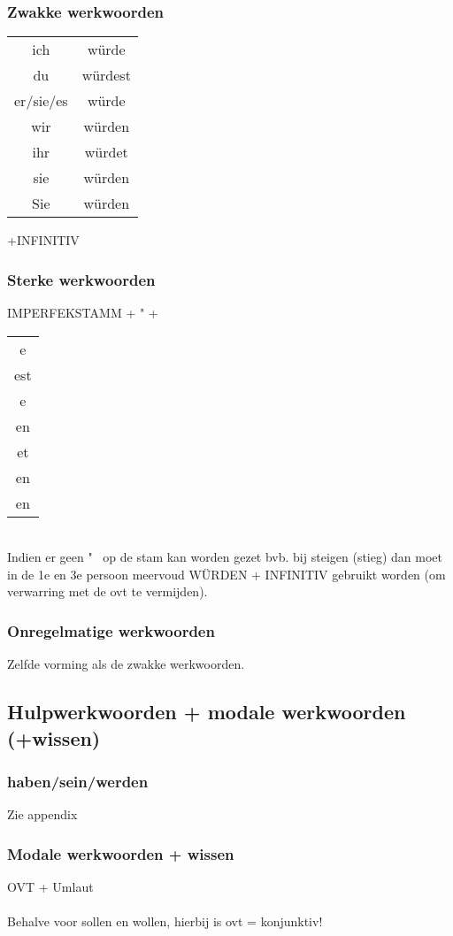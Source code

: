 \documentclass[main.tex]{subfiles}
\begin{document}
\subsubsection{Zwakke werkwoorden}
\begin{tabular}{cc}

ich & würde \\ 

du & würdest \\ 

er/sie/es & würde \\ 

wir & würden \\ 

ihr & würdet \\ 
 
sie & würden \\ 
Sie & würden  
\end{tabular} 
+INFINITIV
\subsubsection{Sterke werkwoorden}
IMPERFEKSTAMM + " +
\begin{tabular}{c} 
					e\\
					est\\
					e\\
					en\\
					et\\
					en\\
					en\\
									
					
\end{tabular}\\
Indien er geen " \ op de stam kan worden gezet bvb. bij steigen (stieg) dan moet in de 1e en 3e persoon meervoud WÜRDEN + INFINITIV gebruikt worden (om verwarring met de ovt te vermijden).
\subsubsection{Onregelmatige werkwoorden}
Zelfde vorming als de zwakke werkwoorden.
\subsection{Hulpwerkwoorden + modale werkwoorden (+wissen)}
\subsubsection{haben/sein/werden}
Zie appendix
\subsubsection{Modale werkwoorden + wissen}
OVT + Umlaut\\
\\
Behalve voor sollen en wollen, hierbij is ovt = konjunktiv!
\end{document}
